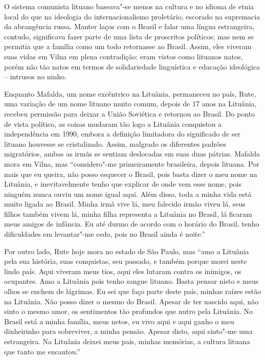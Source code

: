 O sistema comunista lituano
baseava"-se menos na cultura e no idioma de etnia local do que na
ideologia do internacionalismo proletário, escorado na supremacia da
abrangência russa. Manter laços com o Brasil e falar uma língua
estrangeira, contudo, significava fazer parte de uma lista de proscritos
políticos; mas nem se permitia que a família como um todo retornasse ao
Brasil. Assim, eles viveram suas vidas em Vilna em plena contradição:
eram vistos como lituanos natos, porém não tão natos em termos de
solidariedade linguística e educação ideológica -- intrusos no ninho.

Enquanto Mafalda, um nome excêntrico na Lituânia, permaneceu no país, 
Rute, uma variação de um nome lituano muito comum, depois de
17 anos na Lituânia, recebeu permissão para deixar a União
Soviética e retornou ao Brasil. Do ponto de vista político, as coisas
mudaram tão logo a Lituânia conquistou a independência em 1990, embora a
definição limitadora do significado de ser lituano houvesse se
cristalizado. Assim, malgrado os diferentes padrões migratórios, ambas
as irmãs se sentiam deslocadas em suas duas pátrias. Mafalda mora em Vilna, mas
``considero"-me primeiramente brasileira, depois lituana. Por
mais que eu queira, não posso esquecer o Brasil, pois basta dizer o meu
nome na Lituânia, e inevitavelmente tenho que explicar de onde vem esse
nome, pois ninguém nunca ouviu um nome igual aqui. Além disso, toda a
minha vida está muito ligada ao Brasil. Minha irmã vive lá, meu falecido
irmão viveu lá, seus filhos também vivem lá, minha filha representa a
Lituânia no Brasil, lá ficaram meus amigos de infância. Eu até durmo de
acordo com o horário do Brasil, tenho dificuldades em levantar"-me cedo,
pois no Brasil ainda é noite.''

Por outro lado, Rute hoje mora no estado de São Paulo, mas ``amo a Lituânia pela sua história, suas conquistas,
seu passado, e também porque morei neste lindo país. 
Aqui viveram meus tios, aqui eles 
lutaram contra os inimigos, os ocupantes. Amo a Lituânia pois tenho
sangue lituano. Basta pensar nisto e meus olhos se enchem de lágrimas.
Eu sei que faço parte deste país, minhas raízes estão na Lituânia. Não
posso dizer o mesmo do Brasil. Apesar de ter nascido aqui, não sinto o
mesmo amor, os sentimentos tão profundos que nutro pela Lituânia. No
Brasil está a minha família, meus netos, eu vivo aqui e aqui ganho o meu
dinheirinho para sobreviver, a minha pensão. Apesar disto, aqui
sinto"-me uma estrangeira. Na Lituânia deixei meus pais, minhas memórias,
a cultura lituana que tanto me encantou.''

